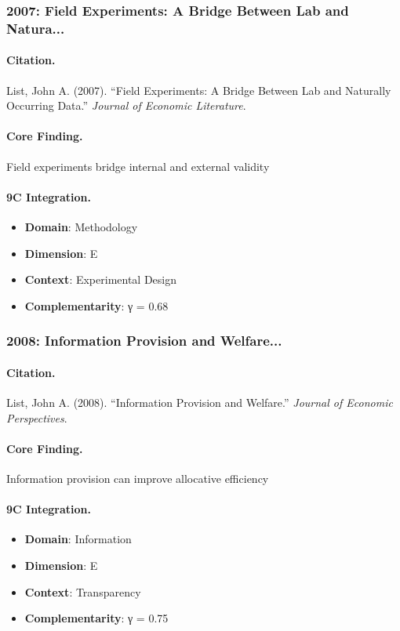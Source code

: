 \subsubsection{2007: Field Experiments: A Bridge Between Lab and Natura...}

\paragraph{Citation.}
List, John A. (2007). ``Field Experiments: A Bridge Between Lab and Naturally Occurring Data.''
\textit{Journal of Economic Literature}.

\paragraph{Core Finding.}
Field experiments bridge internal and external validity

\paragraph{9C Integration.}
\begin{itemize}[nosep]
  \item \textbf{Domain}: Methodology
  \item \textbf{Dimension}: E
  \item \textbf{Context}: Experimental Design
  \item \textbf{Complementarity}: γ = 0.68
\end{itemize}


\subsubsection{2008: Information Provision and Welfare...}

\paragraph{Citation.}
List, John A. (2008). ``Information Provision and Welfare.''
\textit{Journal of Economic Perspectives}.

\paragraph{Core Finding.}
Information provision can improve allocative efficiency

\paragraph{9C Integration.}
\begin{itemize}[nosep]
  \item \textbf{Domain}: Information
  \item \textbf{Dimension}: E
  \item \textbf{Context}: Transparency
  \item \textbf{Complementarity}: γ = 0.75
\end{itemize}


